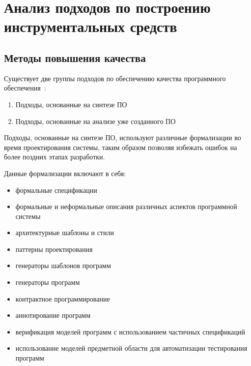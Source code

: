 \chapter{Анализ подходов по построению инструментальных средств}
\section{Методы повышения качества}
\label{sec:quality_methods}

Существует две группы подходов по обеспечению качества программного
обеспечения~\cite{itsykson}:

\begin{enumerate}
    \item Подходы, основанные на синтезе ПО
    \item Подходы, основанные на анализе уже созданного ПО
\end{enumerate}

Подходы, основанные на синтезе ПО, используют различные формализации во время
проектирования системы, таким образом позволяя избежать ошибок на более поздних
этапах разработки.

Данные формализации включают в себя:

\begin{itemize}
    \item формальные спецификации
    \item формальные и неформальные описания различных аспектов программной
    системы
    \item архитектурные шаблоны и стили
    \item паттерны проектирования
    \item генераторы шаблонов программ
    \item генераторы программ
    \item контрактное программирование
    \item аннотирование программ
    \item верификация моделей программ с использованием частичных спецификаций
    \item использование моделей предметной области для автоматизации
    тестирования программ
\end{itemize}

